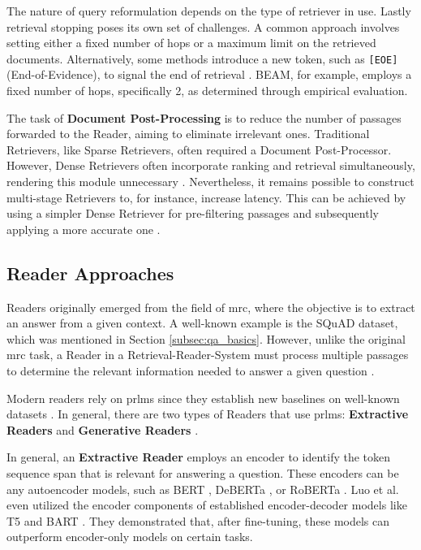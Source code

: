 The nature of query reformulation depends on the type of retriever in use. Lastly retrieval stopping poses its own set of challenges. A common approach involves setting either a fixed number of hops or a maximum limit on the retrieved documents. Alternatively, some methods introduce a new token, such as \verb|[EOE]| (End-of-Evidence), to signal the end of retrieval \cite{zhu_retrieving_2021}. BEAM, for example, employs a fixed number of hops, specifically 2, as determined through empirical evaluation.

The task of \textbf{Document Post-Processing} is to reduce the number of passages forwarded to the Reader, aiming to eliminate irrelevant ones. Traditional Retrievers, like Sparse Retrievers, often required a Document Post-Processor. However, Dense Retrievers often incorporate ranking and retrieval simultaneously, rendering this module unnecessary \cite{zhu_retrieving_2021}. Nevertheless, it remains possible to construct multi-stage Retrievers to, for instance, increase latency. This can be achieved by using a simpler Dense Retriever for pre-filtering passages and subsequently applying a more accurate one \cite{liu_dense_2021}.


\subsection{Reader Approaches}
\label{subsec:qa_reader}

Readers originally emerged from the field of \gls{mrc}, where the objective is to extract an answer from a given context. A well-known example is the SQuAD \cite{rajpurkar_squad_2016} dataset, which was mentioned in Section \ref{subsec:qa_basics}. However, unlike the original \gls{mrc} task, a Reader in a Retrieval-Reader-System must process multiple passages to determine the relevant information needed to answer a given question \cite{zhu_retrieving_2021}. 

Modern readers rely on \gls{prlm}s since they establish new baselines on well-known datasets \cite{luo_choose_2022}. In general, there are two types of Readers that use \gls{prlm}s: \textbf{Extractive Readers} and \textbf{Generative Readers} \cite{jurafsky_speech_2023,zhu_retrieving_2021,luo_choose_2022}.

In general, an \textbf{Extractive Reader} employs an encoder to identify the token sequence span that is relevant for answering a question. These encoders can be any autoencoder models, such as BERT \cite{devlin_bert_2019}, DeBERTa \cite{he_deberta_2020}, or RoBERTa \cite{liu_roberta_2019}. Luo et al. \cite{luo_choose_2022} even utilized the encoder components of established encoder-decoder models like T5 \cite{raffel_exploring_2023} and BART \cite{lewis_bart_2019}. They demonstrated that, after fine-tuning, these models can outperform encoder-only models on certain tasks.

